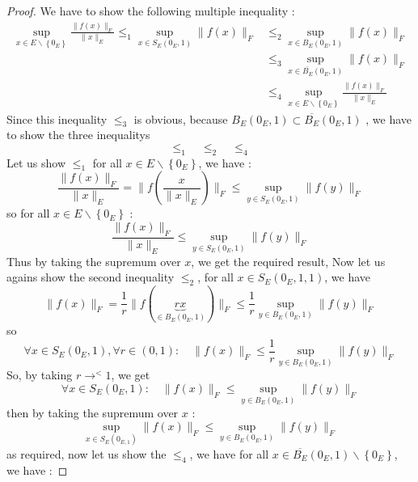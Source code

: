  \begin{proof}
 We have to show the following multiple inequality : 
 \begin{align*}
 \sup_{x \in  E \backslash \left\{ 0_{E} \right\}}  
 \frac{\| f(x)  \| _{F}}{\| x \| _{E}} 
 \leq_{1}
 \sup_{x \in S_{E} \left( 0_{E},1 \right)} 
 \| f(x)  \| _{F} &\leq _{2}
 \sup_{x \in  B_{E} \left( 0_{E},1 \right)}  
 \| f(x)  \|  _{F} \\
		  & \leq _{3}
		  \sup_{x \in \overline{B_{E}} 
		  \left( 0_{E},1 \right)}  
		  \| f(x)  \|  _{F} \\
		  & \leq _{4}
		  \sup_{x \in E \backslash \left\{ 0_{E} \right\}}  
		  \frac{\| f(x)  \| _{F}}{\| x \| _{E}}
 \end{align*}
 Since this inequality $ \leq _{3}$ is obvious, because
 $B_{E} \left( 0_{E},1 \right) 
 \subset \overline{B_{E}} \left( 0_{E},1 \right)$ , we have to show
 the three inequalitys 
 \[
 	\leq _{1} \quad \leq _{2} \quad \leq_{4}
 \]
 Let us show $ \leq _{1}$  for all $x \in E \backslash \left\{ 0_{E}
 \right\}$, we have : 
 \[
	 \frac{\| f(x)  \| _{F}}{\| x \| _{E}} 
	 = 
	 \| f \left( \frac{x}{\| x \| _{E}} \right) \| _{F} 
	 \leq 
	 \sup_{y \in  S_{E} \left( 0_{E},1 \right)}  
	 \| f(y)  \| _{F} 
 \]
 so for all $x \in E \backslash \left\{ 0_{E} \right\}$ :
 \[
 \frac{\| f(x)  \| _{F}}{\| x \| _{E}} 
 \leq \sup_{y \in S_{E} \left( 0_{E},1 \right)}  
 \| f(y)  \| _{F}
 \]
 Thus by taking the supremum over $x$, we get the required result, 
 Now let us agains show the second inequality $ \leq _{2}$, 
 for all $ x \in S_{E} \left( 0_{E},1,1 \right)$, we have
  \[
	  \| f(x)  \| _{F} =  \frac{1}{r} 
	  \| 
	  f  ( 
	  \underbrace{rx
	  }_{ \in B_{E}\left( 0_{E},1 \right)}   )
	  \|_{F} 
	  \leq \frac{1}{r}
	  \sup_{y \in B_{E} \left( 0_{E},1 \right)}  
	  \| f(y)  \| _{F}
  \]
  so 
  \[
  \forall x \in S_{E} \left( 0_{E},1\right) ,
  \forall r \in  \left( 0,1 \right) : \quad 
  \| f(x)  \| _{F} \leq 
  \frac{1}{r}\sup_{y \in B_{E}\left( 0_{E},1 \right)} 
  \| f(y)  \| _{F}
  \]
  So, by taking $r \rightarrow ^{<}1$, we get 
  \[
  \forall x \in S_{E}\left( 0_{E},1 \right): 
 \quad 
 \| f(x)  \| _{F} \leq 
 \sup_{ y \in B_{E} \left( 0_{E},1 \right)}  
 \| f(y)  \| _{F}
  \]
  then by taking the supremum over $x$ : 
  \[
  \sup_{x \in S_{E} \left( 0_{E,1} \right)}  
  \| f(x)  \| _{F} \leq 
  \sup_{y \in  B_{E} \left( 0_{E},1 \right)}  
  \| f(y)  \| _{F}
  \]
  as required, now let us show the $ \leq _{4}$, we have for all
  $x \in \overline{B_{E}}\left( 0_{E},1 \right) \backslash 
  \left\{ 0_{E} \right\}$, we have : 

\end{proof}
